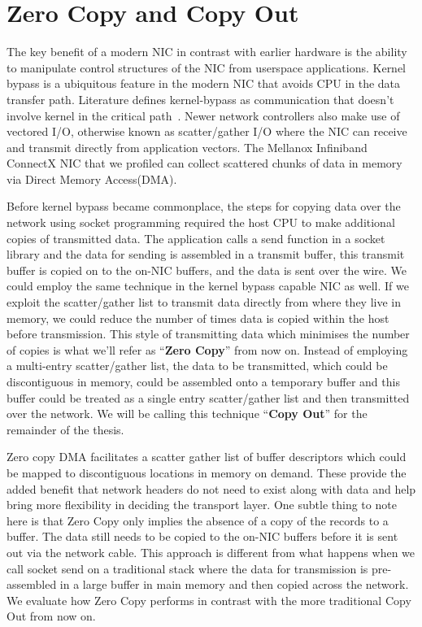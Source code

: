 \section{Zero Copy and Copy Out}
The key benefit of a modern NIC in contrast with earlier hardware is the ability to manipulate control structures of the NIC from userspace applications. 
Kernel bypass is a ubiquitous feature in the modern NIC that avoids CPU in the data transfer path. Literature defines kernel-bypass as communication that doesn't 
involve kernel in the critical path~\cite{unetkernelbypass}. Newer network controllers also make use of vectored I/O, otherwise known as scatter/gather I/O
where the NIC can receive and transmit directly from application vectors. The Mellanox Infiniband ConnectX
NIC that we profiled can collect scattered chunks of data in memory via Direct Memory Access(DMA).

Before kernel bypass became commonplace, the steps for copying data over the network using socket programming 
required the host CPU to make additional copies of transmitted data.
The application calls a send function in a socket library and the data for sending is assembled 
in a transmit buffer, this transmit buffer is copied on to the on-NIC buffers, and the data is 
sent over the wire. We could employ the same technique in the kernel bypass capable NIC as well.
If we exploit the scatter/gather list to transmit data directly from where they live in memory, 
we could reduce the number of times data is copied within the host before transmission. 
This style of transmitting data which minimises the number of copies is what we'll refer as \enquote{\textbf{Zero Copy}} from now on.
Instead of employing a multi-entry scatter/gather list, the data to be transmitted, which could be discontiguous in memory, could be assembled 
onto a temporary buffer and this buffer could be treated as a single entry scatter/gather list
and then transmitted over the network. We will be calling this technique \enquote{\textbf{Copy Out}} for the remainder of the thesis. 


Zero copy DMA facilitates a scatter gather list of buffer descriptors
which could be mapped to discontiguous locations in memory on demand. These provide
the added benefit that network headers do not need to exist along with data and help bring more flexibility 
in deciding the transport layer. One subtle thing to note here is that Zero Copy only implies the absence 
of a copy of the records to a buffer. The data still needs to be copied to the on-NIC buffers before 
it is sent out via the network cable. This approach is different from what happens when we call socket send on 
a traditional stack where the data for transmission is pre-assembled in a large buffer in main memory 
and then copied across the network. We evaluate how Zero Copy performs in contrast 
with the more traditional Copy Out from now on.

